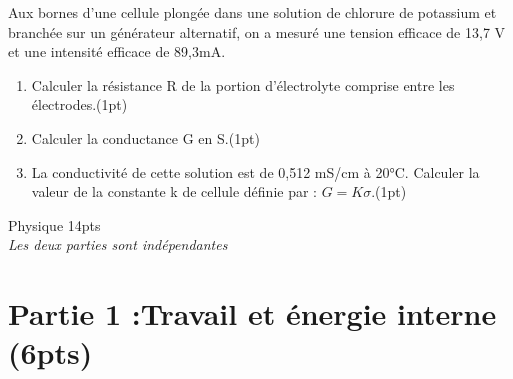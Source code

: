 \documentclass[12pt]{article}
\begin{document}
   Aux bornes d’une cellule plongée dans une solution de chlorure de potassium et branchée sur un
générateur alternatif, on a mesuré une tension efficace de 13,7 V et une intensité efficace de 89,3mA.

\begin{enumerate}
    \item Calculer la résistance R de la portion d’électrolyte comprise entre les électrodes.\dotfill(1pt)
    \item Calculer la conductance G en S.\dotfill(1pt)
    \item La conductivité de cette solution est de 0,512 mS/cm à 20°C. Calculer la valeur de la constante k de cellule définie par : $G=K\sigma$.\dotfill(1pt)
\end{enumerate}


\begin{center}
    \vspace{0cm}
\hrulefill
\Large{Physique 14pts}
\hrulefill\\
    \emph{Les deux parties sont indépendantes}
\end{center}

\section*{Partie 1 :Travail et énergie interne  \dotfill(6pts)}
\end{document}
